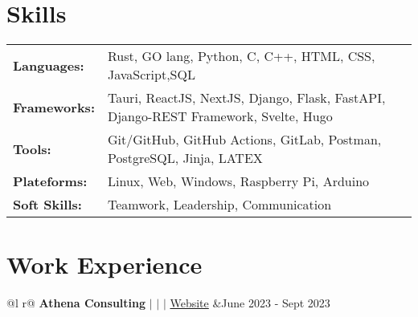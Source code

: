 \documentclass[legalpaper,11pt]{article}
\begin{document}
\section{Skills}
\begin{tabularx}{\linewidth}{@{}l X@{}}
\textbf{Languages:} &  \normalsize{Rust, GO lang, Python, C, C++, HTML, CSS, JavaScript,SQL}\\
\textbf{Frameworks:}  &  \normalsize{Tauri, ReactJS, NextJS, Django, Flask, FastAPI, Django-REST Framework, Svelte, Hugo}\\  
\textbf{Tools:} &  \normalsize{Git/GitHub, GitHub Actions, GitLab, Postman, PostgreSQL, Jinja, LATEX} \\
\textbf{Plateforms:} &  \normalsize{Linux, Web, Windows, Raspberry Pi, Arduino}\\
\textbf{Soft Skills:} &  \normalsize{Teamwork, Leadership, Communication}\\
\end{tabularx}

\section{Work Experience}

\begin{tabularx}{\linewidth}{ @{}l r@{} }
\textbf {Athena Consulting} $|$  $|$  $|$ \href{https://www.athenaconsulting.io/}{Website} &\hfill June 2023 - Sept 2023 \\[3.75pt]
  \\
\end{tabularx}

\end{document}
